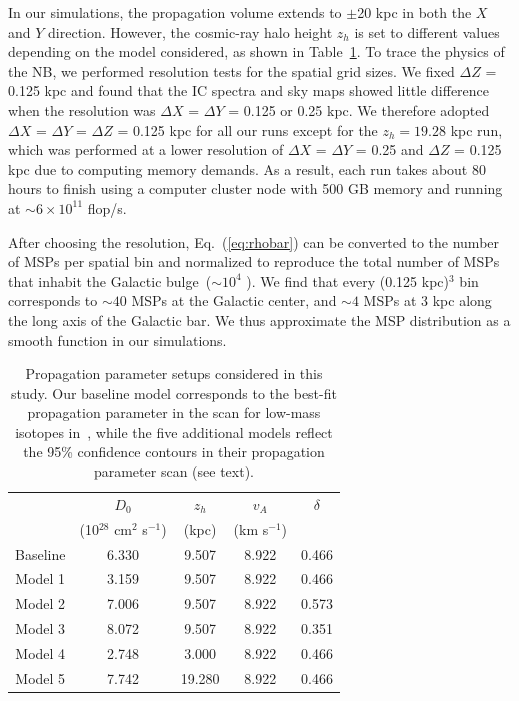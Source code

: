 \documentclass[doublespace,nopageskip]{VTthesis}
\begin{document}
In our simulations, the propagation volume extends to $\pm$20 kpc in both the $X$ and $Y$ direction. However, the cosmic-ray halo height $z_h$ is set to different values depending on the model considered, as shown in Table~\ref{tab:dpara}. To trace the physics of the NB, we performed resolution tests for the spatial grid sizes. We fixed $\Delta Z$ = 0.125 kpc and found that the IC spectra and sky maps showed little difference when the resolution was $\Delta X$ = $\Delta Y$ = 0.125 or 0.25 kpc. We therefore adopted $\Delta X$ = $\Delta Y$ = $\Delta Z$ = 0.125 kpc for all our runs except for the $z_h = 19.28$ kpc run, which was performed at a lower resolution of $\Delta X$ = $\Delta Y$ = 0.25 and $\Delta Z$ = 0.125 kpc due to computing memory demands. As a result, each run takes about 80 hours to finish using a computer cluster node with 500 GB memory and running at $\sim 6 \times 10^{11}$ flop/s.

After choosing the resolution, Eq.~(\ref{eq:rhobar}) can be converted to the number of MSPs per spatial bin and normalized to reproduce the total number of MSPs that inhabit the Galactic bulge~($\sim 10^4$ \cite{2018ApJ...863..199G}). We find that every (0.125 kpc)$^3$ bin corresponds to $\sim 40$ MSPs at the Galactic center, and $\sim 4$ MSPs at 3 kpc along the long axis of the Galactic bar. We thus approximate the MSP distribution as a smooth function in our simulations.

\begin{table}[htb]
  \centering
  \caption{Propagation parameter setups considered in this study. Our baseline model corresponds to the best-fit propagation parameter in the scan for low-mass isotopes in~\citet{2016ApJ...824...16J}, while the five additional models reflect the 95\% confidence contours in their propagation parameter scan \cite{2016ApJ...824...16J} (see text).}
    \begin{tabular}{ c c c c c }
    \toprule
      & $D_0$ & $z_h$ & $v_A$  &$\delta$ \\
      & (10$^{28}$ cm$^2$ s$^{-1}$) & (kpc) & (km s$^{-1}$) & \\ 
      \midrule
      Baseline & 6.330 & 9.507 & 8.922 & 0.466 \\
      Model 1 & 3.159 & 9.507 & 8.922 & 0.466 \\
      Model 2 & 7.006 & 9.507 & 8.922 & 0.573 \\
      Model 3 & 8.072 & 9.507 & 8.922 & 0.351 \\
      Model 4 & 2.748 & 3.000 & 8.922 & 0.466 \\
      Model 5 & 7.742 & 19.280 & 8.922 & 0.466 \\
      \bottomrule
    \end{tabular}
\label{tab:dpara}
\end{table}
\end{document}
